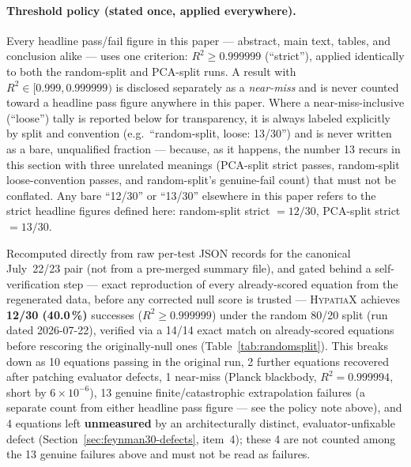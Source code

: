 \documentclass[twoside,11pt]{article}
\newcommand{\Rsq}{R^{2}}
\begin{document}
\paragraph{Threshold policy (stated once, applied everywhere).} Every
headline pass/fail figure in this paper --- abstract, main text, tables,
and conclusion alike --- uses one criterion: $\Rsq \geq 0.999999$
(``strict''), applied identically to both the random-split and PCA-split
runs. A result with $\Rsq \in [0.999, 0.999999)$ is disclosed separately
as a \emph{near-miss} and is never counted toward a headline pass figure
anywhere in this paper. Where a near-miss-inclusive (``loose'') tally is
reported below for transparency, it is always labeled explicitly by split
and convention (e.g.\ ``random-split, loose: 13/30'') and is never written
as a bare, unqualified fraction --- because, as it happens, the number 13
recurs in this section with three unrelated meanings (PCA-split strict
passes, random-split loose-convention passes, and random-split's genuine-fail
count) that must not be conflated. Any bare ``12/30'' or ``13/30'' elsewhere
in this paper refers to the strict headline figures defined here: random-split
strict $=12/30$, PCA-split strict $=13/30$.

Recomputed directly from raw per-test JSON records for the canonical
July~22/23 pair (not from a pre-merged summary file), and gated behind a
self-verification step --- exact reproduction of every already-scored
equation from the regenerated data, before any corrected null score is
trusted --- \textsc{HypatiaX} achieves \textbf{12/30 (40.0\,\%)} successes
($\Rsq \geq 0.999999$) under the random 80/20 split (run dated 2026-07-22),
verified via a 14/14 exact match on already-scored equations before
rescoring the originally-null ones (Table~\ref{tab:randomsplit}). This
breaks down as 10 equations passing in the original run, 2 further
equations recovered after patching evaluator defects, 1 near-miss (Planck
blackbody, $\Rsq = 0.999994$, short by $6\times10^{-6}$), 13 genuine
finite/catastrophic extrapolation failures (a separate count from either
headline pass figure --- see the policy note above), and 4 equations left
\textbf{unmeasured} by an architecturally distinct, evaluator-unfixable defect
(Section~\ref{sec:feynman30-defects}, item~4); these 4 are not counted among
the 13 genuine failures above and must not be read as failures.
\end{document}
